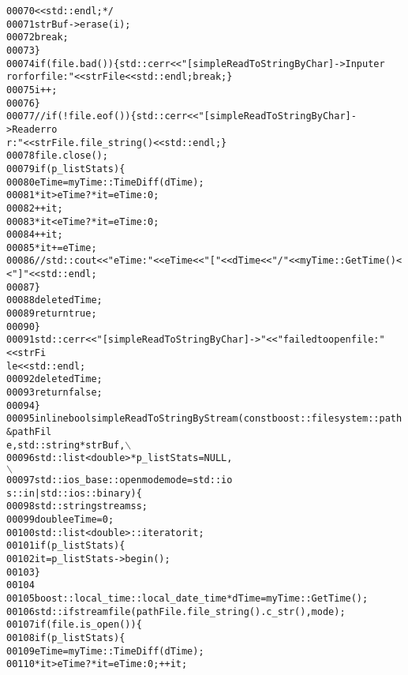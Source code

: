 \begin{footnotesize}
\begin{alltt}
00070 \textcolor{comment}{                    <<std::endl;*/}
00071                     strBuf->erase(i);
00072                     \textcolor{keywordflow}{break};
00073                 \}
00074                 \textcolor{keywordflow}{if} (file.bad())\{ std::cerr<<\textcolor{stringliteral}{"[simpleReadToStringByChar]->Input er
      ror for file: "}<<strFile<<std::endl; \textcolor{keywordflow}{break};\}
00075                 i++;
00076             \}
00077             \textcolor{comment}{//if (!file.eof())\{ std::cerr<<"[simpleReadToStringByChar]->Read erro
      r: "<<strFile.file\_string()<<std::endl; \}}
00078             file.close();
00079             \textcolor{keywordflow}{if} (p\_listStats)\{
00080                 eTime = myTime::TimeDiff( dTime );
00081                 *it > eTime ? *it = eTime : 0;
00082                 ++it;
00083                 *it < eTime ? *it = eTime : 0;
00084                 ++it;
00085                 *it += eTime;
00086                 \textcolor{comment}{//std::cout<<"eTime:"<<eTime<<"["<<dTime<<"/"<<myTime::GetTime()<
      <"]"<<std::endl;}
00087             \}
00088             \textcolor{keyword}{delete} dTime;
00089             \textcolor{keywordflow}{return} \textcolor{keyword}{true};
00090         \}
00091         std::cerr<<\textcolor{stringliteral}{"[simpleReadToStringByChar]->"}<<\textcolor{stringliteral}{"failed to open file: "}<<strFi
      le<<std::endl;
00092         \textcolor{keyword}{delete} dTime;
00093         \textcolor{keywordflow}{return} \textcolor{keyword}{false};
00094     \}
00095     \textcolor{keyword}{inline} \textcolor{keywordtype}{bool} simpleReadToStringByStream(\textcolor{keyword}{const} boost::filesystem::path &pathFil
      e, std::string *strBuf,\(\backslash\)
00096                                            std::list<double> *p\_listStats = NULL,
      \(\backslash\)
00097                                            std::ios\_base::openmode mode = std::io
      s::in|std::ios::binary)\{
00098         std::stringstream ss;
00099         \textcolor{keywordtype}{double} eTime = 0;
00100         std::list<double>::iterator it;
00101         \textcolor{keywordflow}{if}(p\_listStats)\{
00102             it = p\_listStats->begin();
00103         \}
00104 
00105         boost::local\_time::local\_date\_time *dTime = myTime::GetTime();
00106         std::ifstream file(pathFile.file\_string().c\_str(),mode);
00107         \textcolor{keywordflow}{if} (file.is\_open())\{
00108             \textcolor{keywordflow}{if} (p\_listStats)\{
00109                 eTime = myTime::TimeDiff( dTime );
00110                 *it > eTime ? *it = eTime : 0;      ++it;

\end{alltt}
\end{footnotesize}
